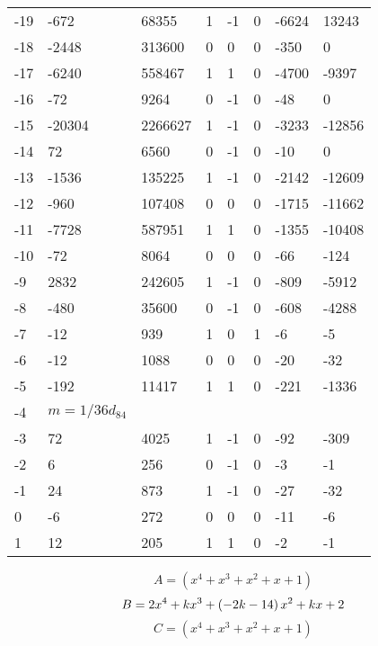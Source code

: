 \documentclass{amsart}
\begin{document}
\begin{longtable}{|l|l|l|lllll|}
-19&-672&68355&1&-1&0&-6624&13243\\
-18&-2448&313600&0&0&0&-350&0\\
-17&-6240&558467&1&1&0&-4700&-9397\\
-16&-72&9264&0&-1&0&-48&0\\
-15&-20304&2266627&1&-1&0&-3233&-12856\\
-14&72&6560&0&-1&0&-10&0\\
-13&-1536&135225&1&-1&0&-2142&-12609\\
-12&-960&107408&0&0&0&-1715&-11662\\
-11&-7728&587951&1&1&0&-1355&-10408\\
-10&-72&8064&0&0&0&-66&-124\\
-9&2832&242605&1&-1&0&-809&-5912\\
-8&-480&35600&0&-1&0&-608&-4288\\
-7&-12&939&1&0&1&-6&-5\\
-6&-12&1088&0&0&0&-20&-32\\
-5&-192&11417&1&1&0&-221&-1336\\
-4&$m=1/36d_{84}$&&\multicolumn{5}{c|}{}\\
-3&72&4025&1&-1&0&-92&-309\\
-2&6&256&0&-1&0&-3&-1\\
-1&24&873&1&-1&0&-27&-32\\
0&-6&272&0&0&0&-11&-6\\
1&12&205&1&1&0&-2&-1\\
\hline
\end{longtable}
$$A=(x^4
 + x^3
 + x^2
 + x
 + 1)$$
$$B=2\*x^4
 + k\*x^3
 + \left(-2\*k
 - 14\right) \*x^2
 + k\*x
 + 2$$
$$C=(x^4
 + x^3
 + x^2
 + x
 + 1)$$
\end{document}
